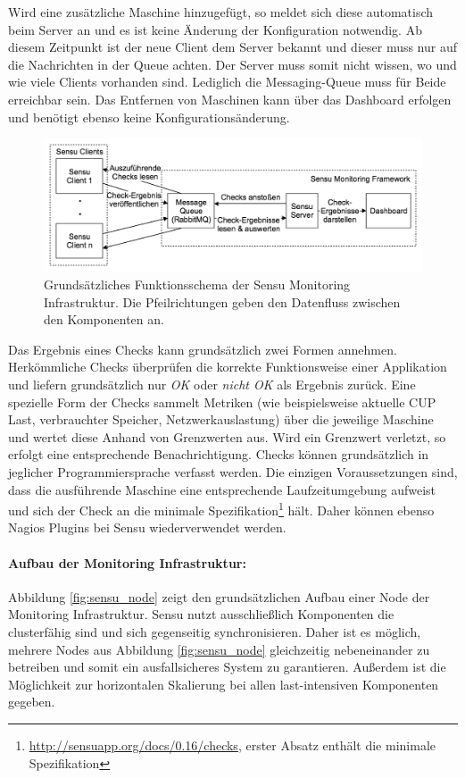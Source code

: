 Wird eine zusätzliche Maschine hinzugefügt, so meldet sich diese automatisch beim Server an und es ist keine Änderung der Konfiguration notwendig. Ab diesem Zeitpunkt ist der neue Client dem Server bekannt und dieser muss nur auf die Nachrichten in der Queue achten. Der Server muss somit nicht wissen, wo und wie viele Clients vorhanden sind. Lediglich die Messaging-Queue muss für Beide erreichbar sein. Das Entfernen von Maschinen kann über das Dashboard erfolgen und benötigt ebenso keine Konfigurationsänderung.

\begin{figure}[ht]
	\centering
	\includegraphics[width=0.999\textwidth]{img/sensu.png}
	\caption[Grundsätzliches Funktionsschema der Sensu Monitoring Infrastruktur]{Grundsätzliches Funktionsschema der Sensu Monitoring Infrastruktur. Die Pfeilrichtungen geben den Datenfluss zwischen den Komponenten an.}
	\label{fig:sensu_schema}
\end{figure}

Das Ergebnis eines Checks kann grundsätzlich zwei Formen annehmen. Herkömmliche Checks überprüfen die korrekte Funktionsweise einer Applikation und liefern grundsätzlich nur \textit{OK} oder \textit{nicht OK} als Ergebnis zurück. Eine spezielle Form der Checks sammelt Metriken (wie beispielsweise aktuelle CUP Last, verbrauchter Speicher, Netzwerkauslastung) über die jeweilige Maschine und wertet diese Anhand von Grenzwerten aus. Wird ein Grenzwert verletzt, so erfolgt eine entsprechende Benachrichtigung. Checks können grundsätzlich in jeglicher Programmiersprache verfasst werden. Die einzigen Voraussetzungen sind, dass die ausführende Maschine eine entsprechende Laufzeitumgebung aufweist und sich der Check an die minimale Spezifikation\footnote{\url{http://sensuapp.org/docs/0.16/checks}, erster Absatz enthält die minimale Spezifikation} hält. Daher können ebenso Nagios Plugins bei Sensu wiederverwendet werden. 

\paragraph{Aufbau der Monitoring Infrastruktur:}
Abbildung \ref{fig:sensu_node} zeigt den grundsätzlichen Aufbau einer Node der Monitoring Infrastruktur. Sensu nutzt ausschließlich Komponenten die clusterfähig sind und sich gegenseitig synchronisieren. Daher ist es möglich, mehrere Nodes aus Abbildung \ref{fig:sensu_node} gleichzeitig nebeneinander zu betreiben und somit ein ausfallsicheres System zu garantieren. Außerdem ist die Möglichkeit zur horizontalen Skalierung bei allen last-intensiven Komponenten gegeben.

